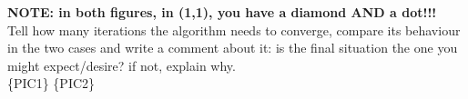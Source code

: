 \documentclass[a4paper,12pt,titlepage]{article} %
\begin{document}
\textbf{NOTE: in both figures, in (1,1), you have a diamond AND a dot!!!}\\

Tell how many iterations the algorithm needs to converge, compare its behaviour in the two cases and write a comment about it: is the final situation the one you might expect/desire? if not, explain why.\\

\{PIC1\} \{PIC2\}

\end{document}
